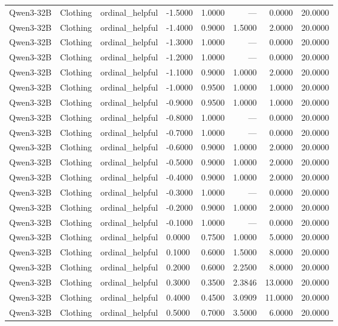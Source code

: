 \begin{table}
\begin{tabular}{llllrrrr}
Qwen3-32B & Clothing & ordinal_helpful & -1.5000 & 1.0000 & --- & 0.0000 & 20.0000 \\
Qwen3-32B & Clothing & ordinal_helpful & -1.4000 & 0.9000 & 1.5000 & 2.0000 & 20.0000 \\
Qwen3-32B & Clothing & ordinal_helpful & -1.3000 & 1.0000 & --- & 0.0000 & 20.0000 \\
Qwen3-32B & Clothing & ordinal_helpful & -1.2000 & 1.0000 & --- & 0.0000 & 20.0000 \\
Qwen3-32B & Clothing & ordinal_helpful & -1.1000 & 0.9000 & 1.0000 & 2.0000 & 20.0000 \\
Qwen3-32B & Clothing & ordinal_helpful & -1.0000 & 0.9500 & 1.0000 & 1.0000 & 20.0000 \\
Qwen3-32B & Clothing & ordinal_helpful & -0.9000 & 0.9500 & 1.0000 & 1.0000 & 20.0000 \\
Qwen3-32B & Clothing & ordinal_helpful & -0.8000 & 1.0000 & --- & 0.0000 & 20.0000 \\
Qwen3-32B & Clothing & ordinal_helpful & -0.7000 & 1.0000 & --- & 0.0000 & 20.0000 \\
Qwen3-32B & Clothing & ordinal_helpful & -0.6000 & 0.9000 & 1.0000 & 2.0000 & 20.0000 \\
Qwen3-32B & Clothing & ordinal_helpful & -0.5000 & 0.9000 & 1.0000 & 2.0000 & 20.0000 \\
Qwen3-32B & Clothing & ordinal_helpful & -0.4000 & 0.9000 & 1.0000 & 2.0000 & 20.0000 \\
Qwen3-32B & Clothing & ordinal_helpful & -0.3000 & 1.0000 & --- & 0.0000 & 20.0000 \\
Qwen3-32B & Clothing & ordinal_helpful & -0.2000 & 0.9000 & 1.0000 & 2.0000 & 20.0000 \\
Qwen3-32B & Clothing & ordinal_helpful & -0.1000 & 1.0000 & --- & 0.0000 & 20.0000 \\
Qwen3-32B & Clothing & ordinal_helpful & 0.0000 & 0.7500 & 1.0000 & 5.0000 & 20.0000 \\
Qwen3-32B & Clothing & ordinal_helpful & 0.1000 & 0.6000 & 1.5000 & 8.0000 & 20.0000 \\
Qwen3-32B & Clothing & ordinal_helpful & 0.2000 & 0.6000 & 2.2500 & 8.0000 & 20.0000 \\
Qwen3-32B & Clothing & ordinal_helpful & 0.3000 & 0.3500 & 2.3846 & 13.0000 & 20.0000 \\
Qwen3-32B & Clothing & ordinal_helpful & 0.4000 & 0.4500 & 3.0909 & 11.0000 & 20.0000 \\
Qwen3-32B & Clothing & ordinal_helpful & 0.5000 & 0.7000 & 3.5000 & 6.0000 & 20.0000 \\

\end{tabular}
\end{table}
